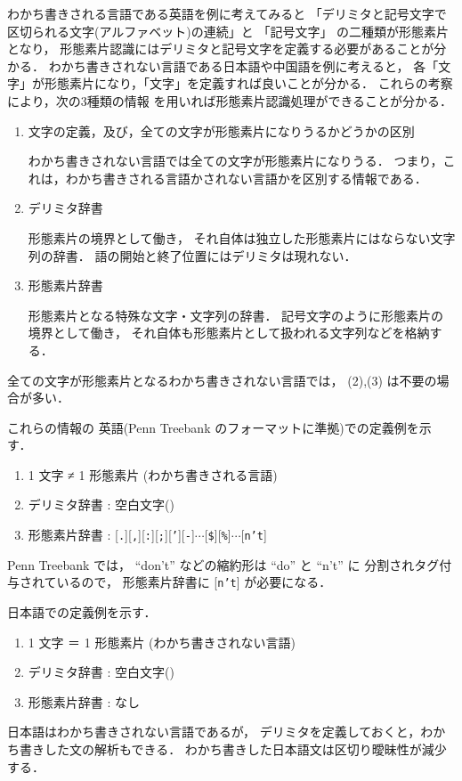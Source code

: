わかち書きされる言語である英語を例に考えてみると
「デリミタと記号文字で区切られる文字(アルファベット)の連続」と
「記号文字」
の二種類が形態素片となり，
形態素片認識にはデリミタと記号文字を定義する必要があることが分かる．
わかち書きされない言語である日本語や中国語を例に考えると，
各「文字」が形態素片になり，「文字」を定義すれば良いことが分かる．
これらの考察により，次の3種類の情報
を用いれば形態素片認識処理ができることが分かる．
\begin{enumerate}
\item 文字の定義，及び，全ての文字が形態素片になりうるかどうかの区別

  わかち書きされない言語では全ての文字が形態素片になりうる．
  つまり，これは，わかち書きされる言語かされない言語かを区別する情報である．

\item デリミタ辞書

  形態素片の境界として働き，
  それ自体は独立した形態素片にはならない文字列の辞書．
 語の開始と終了位置にはデリミタは現れない．

\item 形態素片辞書

  形態素片となる特殊な文字・文字列の辞書．
  記号文字のように形態素片の境界として働き，
  それ自体も形態素片として扱われる文字列などを格納する．

\end{enumerate}

全ての文字が形態素片となるわかち書きされない言語では，
(2),(3) は不要の場合が多い．
  

これらの情報の
英語(Penn Treebank\cite{PennTreebank90} のフォーマットに準拠)での定義例を示す．
\begin{enumerate}
\item 1 文字 ≠ 1 形態素片 (わかち書きされる言語)
\item デリミタ辞書 : 空白文字(\delimi)
\item 形態素片辞書 :
  [{\tt .}][{\tt ,}][{\tt :}][{\tt ;}][{\tt '}][{\tt -}]$\cdots$[{\tt \$}][{\tt \%}]$\cdots$[{\tt n't}]
\end{enumerate}
Penn Treebank では， ``don't'' などの縮約形は ``do'' と ``n't'' に
分割されタグ付与されているので，
形態素片辞書に [{\tt n't}] が必要になる．

日本語での定義例を示す．
\begin{enumerate}
\item 1 文字 ＝ 1 形態素片 (わかち書きされない言語)
\item デリミタ辞書 : 空白文字(\delimi)
\item 形態素片辞書 : なし
\end{enumerate}
日本語はわかち書きされない言語であるが，
デリミタを定義しておくと，わかち書きした文の解析もできる．
わかち書きした日本語文は区切り曖昧性が減少する．

